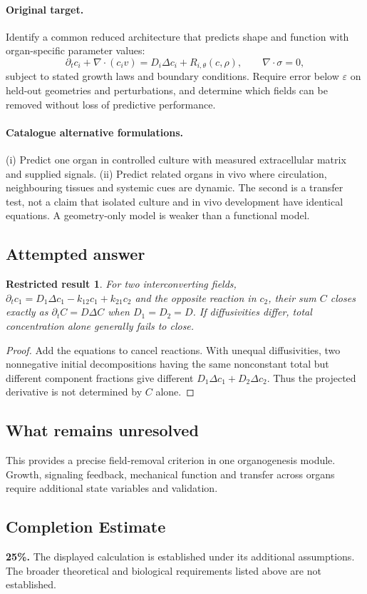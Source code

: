 \documentclass[11pt]{article}
\newtheorem{attemptresult}{Restricted result}[section]
\begin{document}
\paragraph{Original target.}
Identify a common reduced architecture that predicts shape and function with organ-specific parameter values:
\[
\partial_t c_i+\nabla\!\cdot(c_iv)=D_i\Delta c_i+R_{i,\theta}(c,\rho),
\qquad
\nabla\!\cdot\sigma=0,
\]
subject to stated growth laws and boundary conditions. Require error below $\varepsilon$ on held-out geometries and perturbations, and determine which fields can be removed without loss of predictive performance.
\paragraph{Catalogue alternative formulations.}
(i) Predict one organ in controlled culture with measured extracellular matrix and supplied signals. (ii) Predict related organs in vivo where circulation, neighbouring tissues and systemic cues are dynamic. The second is a transfer test, not a claim that isolated culture and in vivo development have identical equations. A geometry-only model is weaker than a functional model.
\subsection{Attempted answer}
\begin{attemptresult}
For two interconverting fields, $\partial_tc_1=D_1\Delta c_1-k_{12}c_1+k_{21}c_2$ and the opposite reaction in $c_2$, their sum $C$ closes exactly as $\partial_tC=D\Delta C$ when $D_1=D_2=D$. If diffusivities differ, total concentration alone generally fails to close.
\end{attemptresult}
\begin{proof}
Add the equations to cancel reactions. With unequal diffusivities, two nonnegative initial decompositions having the same nonconstant total but different component fractions give different $D_1\Delta c_1+D_2\Delta c_2$. Thus the projected derivative is not determined by $C$ alone.
\end{proof}
\subsection{What remains unresolved}
This provides a precise field-removal criterion in one organogenesis module. Growth, signaling feedback, mechanical function and transfer across organs require additional state variables and validation.
\subsection{Completion Estimate}
\textbf{25\%.} The displayed calculation is established under its additional assumptions. The broader theoretical and biological requirements listed above are not established.
\end{document}
